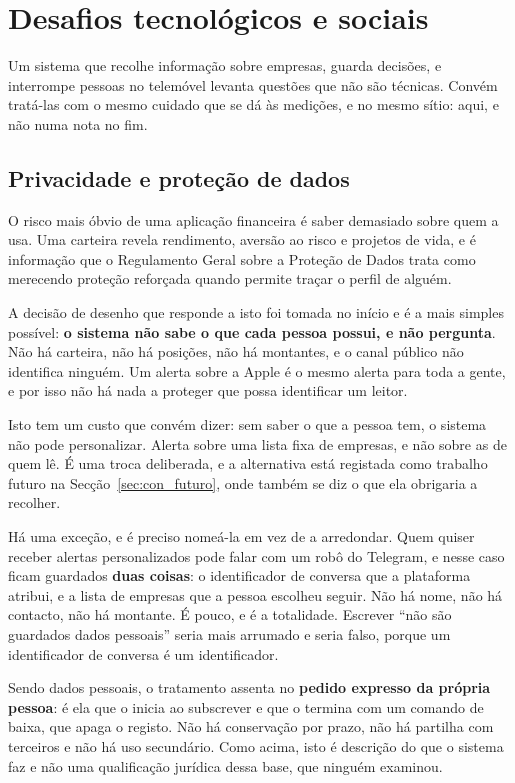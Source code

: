 \section{Desafios tecnológicos e sociais}
\label{sec:met_desafios}

Um sistema que recolhe informação sobre empresas, guarda decisões, e interrompe pessoas no
telemóvel levanta questões que não são técnicas. Convém tratá-las com o mesmo cuidado que se dá
às medições, e no mesmo sítio: aqui, e não numa nota no fim.

\subsection{Privacidade e proteção de dados}
\label{sec:met_privacidade}

O risco mais óbvio de uma aplicação financeira é saber demasiado sobre quem a usa. Uma carteira
revela rendimento, aversão ao risco e projetos de vida, e é informação que o Regulamento Geral
sobre a Proteção de Dados trata como merecendo proteção reforçada quando permite traçar o perfil
de alguém.

A decisão de desenho que responde a isto foi tomada no início e é a mais simples possível: \textbf{o
sistema não sabe o que cada pessoa possui, e não pergunta}. Não há carteira, não há posições, não
há montantes, e o canal público não identifica ninguém. Um alerta sobre a Apple é o mesmo alerta
para toda a gente, e por isso não há nada a proteger que possa identificar um leitor.

Isto tem um custo que convém dizer: sem saber o que a pessoa tem, o sistema não pode
personalizar. Alerta sobre uma lista fixa de empresas, e não sobre as de quem lê. É uma troca
deliberada, e a alternativa está registada como trabalho futuro na Secção~\ref{sec:con_futuro},
onde também se diz o que ela obrigaria a recolher.

Há uma exceção, e é preciso nomeá-la em vez de a arredondar. Quem quiser receber alertas
personalizados pode falar com um robô do Telegram, e nesse caso ficam guardados \textbf{duas coisas}: o
identificador de conversa que a plataforma atribui, e a lista de empresas que a pessoa escolheu
seguir. Não há nome, não há contacto, não há montante. É pouco, e é a totalidade. Escrever
``não são guardados dados pessoais'' seria mais arrumado e seria falso, porque um identificador de
conversa é um identificador.

Sendo dados pessoais, o tratamento assenta no \textbf{pedido expresso da própria pessoa}: é ela
que o inicia ao subscrever e que o termina com um comando de baixa, que apaga o registo. Não há
conservação por prazo, não há partilha com terceiros e não há uso secundário. Como acima, isto é
descrição do que o sistema faz e não uma qualificação jurídica dessa base, que ninguém examinou.

